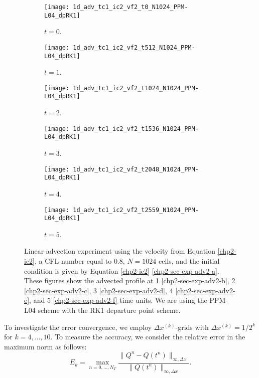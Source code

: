 \begin{figure}[!htb]
	\centering
	\begin{subfigure}{0.3\textwidth}
		\centering
		\texttt{[image: 1d\_adv\_tc1\_ic2\_vf2\_t0\_N1024\_PPM-L04\_dpRK1]}
		\caption{$t=0$.\label{chp2-sec-exp-adv2-a}}
	\end{subfigure}
	\begin{subfigure}{0.3\textwidth}
		\centering
		\texttt{[image: 1d\_adv\_tc1\_ic2\_vf2\_t512\_N1024\_PPM-L04\_dpRK1]}
		\caption{$t=1$.\label{chp2-sec-exp-adv2-b}}
	\end{subfigure}
	\begin{subfigure}{0.3\textwidth}
		\centering
		\texttt{[image: 1d\_adv\_tc1\_ic2\_vf2\_t1024\_N1024\_PPM-L04\_dpRK1]}
		\caption{$t=2$.\label{chp2-sec-exp-adv2-c}}
	\end{subfigure}
	
	\begin{subfigure}{0.3\textwidth}
		\centering
		\texttt{[image: 1d\_adv\_tc1\_ic2\_vf2\_t1536\_N1024\_PPM-L04\_dpRK1]}
		\caption{$t=3$.\label{chp2-sec-exp-adv2-d}}
	\end{subfigure}
	\begin{subfigure}{0.3\textwidth}
		\centering
		\texttt{[image: 1d\_adv\_tc1\_ic2\_vf2\_t2048\_N1024\_PPM-L04\_dpRK1]}
		\caption{$t=4$.\label{chp2-sec-exp-adv2-e}}
	\end{subfigure}
	\begin{subfigure}{0.3\textwidth}
		\centering
		\texttt{[image: 1d\_adv\_tc1\_ic2\_vf2\_t2559\_N1024\_PPM-L04\_dpRK1]}
		\caption{$t=5$.\label{chp2-sec-exp-adv2-f}}
	\end{subfigure}
	\caption{Linear advection experiment using the velocity from Equation \eqref{chp2-ic2},
		a CFL number equal to $0.8$, $N=1024$ cells, and the initial condition is given by 
		Equation \eqref{chp2-ic2} \eqref{chp2-sec-exp-adv2-a}.
		These figures show the advected profile at  1 \eqref{chp2-sec-exp-adv2-b}, 
		2  \eqref{chp2-sec-exp-adv2-c}, 3  \eqref{chp2-sec-exp-adv2-d}, 4  \eqref{chp2-sec-exp-adv2-e},
		and 5  \eqref{chp2-sec-exp-adv2-f} time units.
		We are using the PPM-L04 scheme with the RK1 departure point scheme. \label{chp2-sec-exp-adv2}}
\end{figure}
To investigate the error convergence, we employ $\Delta x^{(k)}$-grids with $\Delta x^{(k)} = 1/2^k$ for 
$k = 4, \ldots, 10$.
To measure the accuracy, we consider the relative error in the maximum norm as follows:
\begin{equation*}
	E_k = \max_{n=0,\ldots, N_T}
	\frac{\| Q^n - Q(t^n) \|_{\infty, \Delta x}}{\|Q(t^n)\|_{\infty, \Delta x}}.
\end{equation*}
